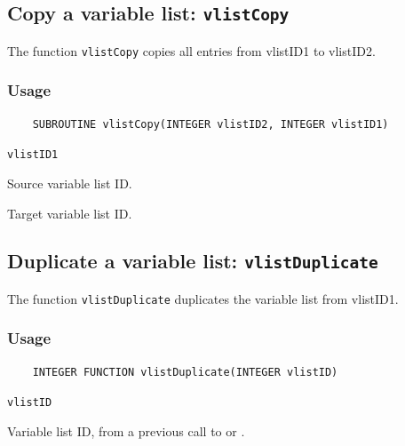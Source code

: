 \subsection{Copy a variable list: \texttt{vlistCopy}}
\label{vlistCopy}

The function {\texttt{vlistCopy}} copies all entries from vlistID1 to vlistID2.

\subsubsection*{Usage}

\begin{verbatim}
    SUBROUTINE vlistCopy(INTEGER vlistID2, INTEGER vlistID1)
\end{verbatim}

\hspace*{4mm}\begin{minipage}[]{15cm}
\begin{deflist}{\texttt{vlistID1}\ }
\item[\texttt{vlistID1}]
Source variable list ID.
\item[\texttt{vlistID2}]
Target variable list ID.

\end{deflist}
\end{minipage}


\subsection{Duplicate a variable list: \texttt{vlistDuplicate}}
\label{vlistDuplicate}

The function {\texttt{vlistDuplicate}} duplicates the variable list from vlistID1.

\subsubsection*{Usage}

\begin{verbatim}
    INTEGER FUNCTION vlistDuplicate(INTEGER vlistID)
\end{verbatim}

\hspace*{4mm}\begin{minipage}[]{15cm}
\begin{deflist}{\texttt{vlistID}\ }
\item[\texttt{vlistID}]
Variable list ID, from a previous call to {} or {}.

\end{deflist}
\end{minipage}

